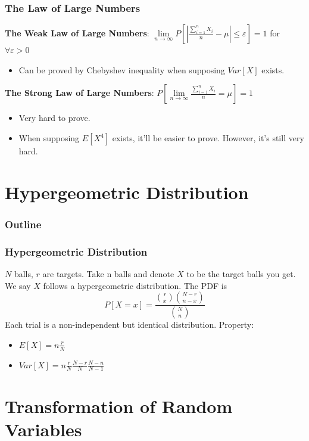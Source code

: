 \documentclass{beamer}
\begin{document}
\begin{frame}
    \frametitle{The Law of Large Numbers}
    \textbf{The Weak Law of Large Numbers}: $\lim\limits_{n\rightarrow\infty}P[|\frac{\sum\limits_{i=1}^{n}X_i}{n}-\mu|\leq\varepsilon]=1$ for $\forall \varepsilon>0$\par
    \begin{itemize}
        \item Can be proved by Chebyshev inequality when supposing $Var[X]$ exists.
    \end{itemize}
    \vspace{0.3cm}
    \textbf{The Strong Law of Large Numbers}: $P[\lim\limits_{n\rightarrow\infty} \frac{\sum\limits_{i=1}^{n}X_i}{n}=\mu]=1$
    \begin{itemize}
        \item Very hard to prove.
        \item When supposing $E[X^4]$ exists, it'll be easier to prove. However, it's still very hard.
    \end{itemize}
    
\end{frame}

\section{Hypergeometric Distribution}

\begin{frame}
    \frametitle{Outline}
    \tableofcontents[currentsection]
\end{frame}

\begin{frame}
    \frametitle{Hypergeometric Distribution}
    $N$ balls, $r$ are targets. Take n balls and denote $X$ to be the target balls you get. We say $X$ follows a hypergeometric distribution. The PDF is
    \[P[X=x]=\frac{\binom{r}{x}\binom{N-r}{n-x}}{\binom{N}{n}}\]
    Each trial is a non-independent but identical distribution.
    Property:
    \begin{itemize}
        \item $E[X]=n\frac{r}{N}$
        \item $Var[X]=n\frac{r}{N}\frac{N-r}{N}\frac{N-n}{N-1}$
    \end{itemize}
\end{frame}

\section{Transformation of Random Variables}
\end{document}
